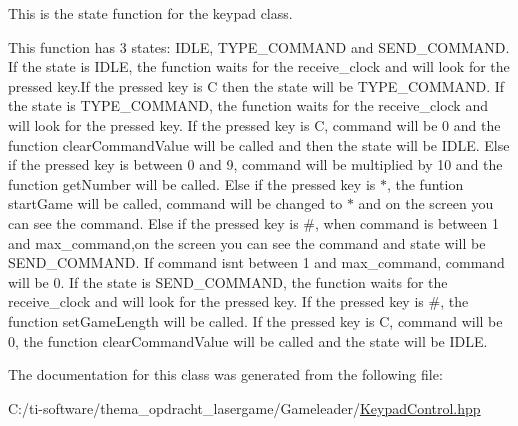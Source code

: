 This is the state function for the keypad class. 

This function has 3 states\+: I\+D\+LE, T\+Y\+P\+E\+\_\+\+C\+O\+M\+M\+A\+ND and S\+E\+N\+D\+\_\+\+C\+O\+M\+M\+A\+ND. If the state is I\+D\+LE, the function waits for the receive\+\_\+clock and will look for the pressed key.\+If the pressed key is C then the state will be T\+Y\+P\+E\+\_\+\+C\+O\+M\+M\+A\+ND. If the state is T\+Y\+P\+E\+\_\+\+C\+O\+M\+M\+A\+ND, the function waits for the receive\+\_\+clock and will look for the pressed key. If the pressed key is C, command will be 0 and the function clear\+Command\+Value will be called and then the state will be I\+D\+LE. Else if the pressed key is between 0 and 9, command will be multiplied by 10 and the function get\+Number will be called. Else if the pressed key is $\ast$, the funtion start\+Game will be called, command will be changed to $\ast$ and on the screen you can see the command. Else if the pressed key is \#, when command is between 1 and max\+\_\+command,on the screen you can see the command and state will be S\+E\+N\+D\+\_\+\+C\+O\+M\+M\+A\+ND. If command isn\textquotesingle{}t between 1 and max\+\_\+command, command will be 0. If the state is S\+E\+N\+D\+\_\+\+C\+O\+M\+M\+A\+ND, the function waits for the receive\+\_\+clock and will look for the pressed key. If the pressed key is \#, the function set\+Game\+Length will be called. If the pressed key is C, command will be 0, the function clear\+Command\+Value will be called and the state will be I\+D\+LE. 

The documentation for this class was generated from the following file\+:\begin{DoxyCompactItemize}
\item 
C\+:/ti-\/software/thema\+\_\+opdracht\+\_\+lasergame/\+Gameleader/\mbox{\hyperlink{_keypad_control_8hpp}{Keypad\+Control.\+hpp}}\end{DoxyCompactItemize}
